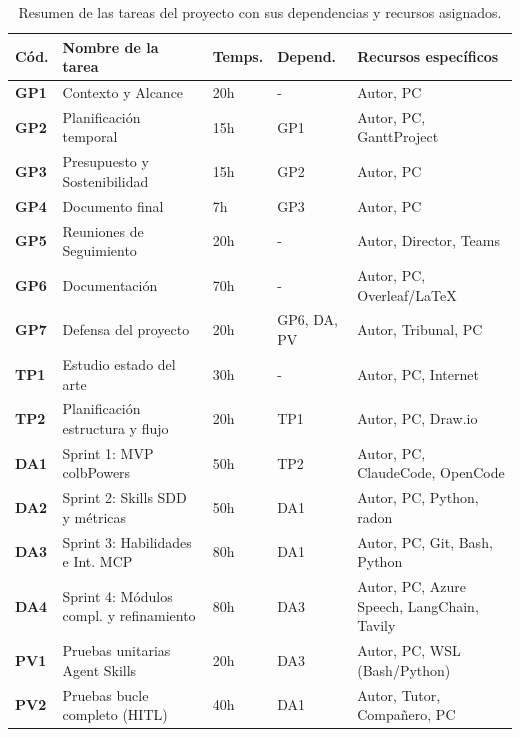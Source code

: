\documentclass[11pt, letterpaper]{article}
\begin{document}
\begin{table}[H]
\centering
\begin{tabularx}{\textwidth}{
  >{\centering\arraybackslash}p{1.2cm}
  >{\raggedright\arraybackslash}X
  >{\centering\arraybackslash}p{1.5cm}
  >{\centering\arraybackslash}p{2.5cm}
  >{\raggedright\arraybackslash}p{3.8cm}
}
\toprule
\textbf{Cód.} & \textbf{Nombre de la tarea} & \textbf{Temps.} & \textbf{Depend.} & \textbf{Recursos específicos} \\
\midrule
\textbf{GP1} & Contexto y Alcance & 20h & - & Autor, PC \\
\textbf{GP2} & Planificación temporal & 15h & GP1 & Autor, PC, GanttProject \\
\textbf{GP3} & Presupuesto y Sostenibilidad & 15h & GP2 & Autor, PC \\
\textbf{GP4} & Documento final & 7h & GP3 & Autor, PC \\
\textbf{GP5} & Reuniones de Seguimiento & 20h & - & Autor, Director, Teams \\
\textbf{GP6} & Documentación & 70h & - & Autor, PC, Overleaf/LaTeX \\
\textbf{GP7} & Defensa del proyecto & 20h & GP6, DA, PV & Autor, Tribunal, PC \\
\midrule
\textbf{TP1} & Estudio estado del arte & 30h & - & Autor, PC, Internet \\
\textbf{TP2} & Planificación estructura y flujo & 20h & TP1 & Autor, PC, Draw.io \\
\midrule
\textbf{DA1} & Sprint 1: MVP colbPowers & 50h & TP2 & Autor, PC, ClaudeCode, OpenCode \\
\textbf{DA2} & Sprint 2: Skills SDD y métricas & 50h & DA1 & Autor, PC, Python, radon \\
\textbf{DA3} & Sprint 3: Habilidades e Int. MCP & 80h & DA1 & Autor, PC, Git, Bash, Python \\
\textbf{DA4} & Sprint 4: Módulos compl. y refinamiento & 80h & DA3 & Autor, PC, Azure Speech, LangChain, Tavily \\
\midrule
\textbf{PV1} & Pruebas unitarias Agent Skills & 20h & DA3 & Autor, PC, WSL (Bash/Python) \\
\textbf{PV2} & Pruebas bucle completo (HITL) & 40h & DA1 & Autor, Tutor, Compañero, PC \\
\bottomrule
\end{tabularx}
\caption{Resumen de las tareas del proyecto con sus dependencias y recursos asignados.}
\label{tab:resumen_tareas}
\end{table}
\end{document}
